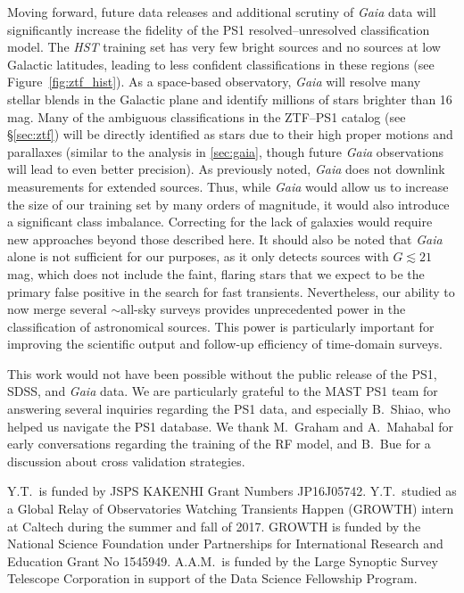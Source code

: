 \documentclass[twocolumn]{aastex62}
\begin{document}
\begin{CJK*}{UTF8}{gbsn}
Moving forward, future data releases and additional scrutiny of
\textit{Gaia} data will significantly increase the fidelity of the PS1
resolved--unresolved classification model. The \textit{HST} training set has
very few bright sources and no sources at low Galactic latitudes, leading to
less confident classifications in these regions (see
Figure~\ref{fig:ztf_hist}). As a space-based observatory, \textit{Gaia} will
resolve many stellar blends in the Galactic plane and identify millions of
stars brighter than 16\,mag. Many of the ambiguous classifications in the
ZTF--PS1 catalog (see \S\ref{sec:ztf}) will be directly identified as stars
due to their high proper motions and parallaxes (similar to the analysis in
\ref{sec:gaia}, though future \textit{Gaia} observations will lead to even
better precision). As previously noted, \textit{Gaia} does not downlink
measurements for extended sources. Thus, while \textit{Gaia} would allow us
to increase the size of our training set by many orders of magnitude, it
would also introduce a significant class imbalance. Correcting for the lack
of galaxies would require new approaches beyond those described here. It
should also be noted that \textit{Gaia} alone is not sufficient for our
purposes, as it only detects sources with $G \lesssim 21$\,mag, which does
not include the faint, flaring stars that we expect to be the primary false
positive in the search for fast transients. Nevertheless, our ability to now
merge several $\sim$all-sky surveys provides unprecedented power in the
classification of astronomical sources. This power is particularly important
for improving the scientific output and follow-up efficiency of time-domain
surveys.

\acknowledgements

This work would not have been possible without the public release of the
PS1, SDSS, and \textit{Gaia} data. We are particularly grateful to the MAST
PS1 team for answering several inquiries regarding the PS1 data, and
especially B.~Shiao, who helped us navigate the PS1 database. We thank
M.~Graham and A.~Mahabal for early conversations regarding the training of
the RF model, and B.~Bue for a discussion about cross validation strategies.

Y.T.\ is funded by JSPS KAKENHI Grant Numbers JP16J05742. Y.T.\ studied as a
Global Relay of Observatories Watching Transients Happen (GROWTH) intern at
Caltech during the summer and fall of 2017. GROWTH is funded by the National
Science Foundation under Partnerships for International Research and
Education Grant No 1545949. A.A.M.\ is funded by the Large Synoptic Survey
Telescope Corporation in support of the Data Science Fellowship Program.








\end{CJK*}
\end{document}
